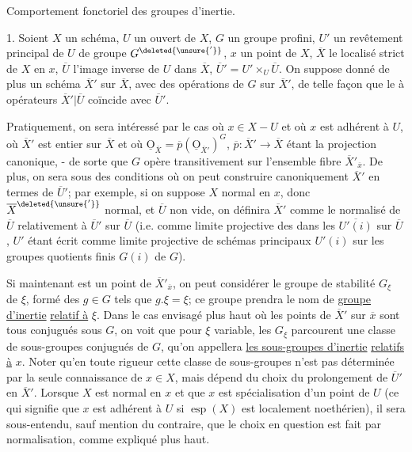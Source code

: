 Comportement fonctoriel des groupes d'inertie.

1. Soient $X$ un schéma, $U$ un ouvert de $X$, $G$ un groupe profini, $U'$ un revêtement principal de $U$ de groupe $G^{\deleted{\unsure{'}}}$, $x$ un point  de $X$, $\overline X$ le localisé strict de $X$ en $x$, $\overline U$ l'image inverse de $U$ dans $\overline X$, $\overline U'=U'\times_U\overline U$. On suppose donné de plus un schéma $\overline X'$ sur $\overline X$, avec des opérations de $G$ sur $\overline X'$, de telle façon que le   à opérateurs $\overline X'|\overline U$ coïncide avec $\overline U'$.

Pratiquement, on sera intéressé par le cas où $x\in X-U$ et où $x$ est adhérent à $U$, où $\overline X'$ est entier sur $\overline X$ et où $\underline{\mathrm O}_{\overline X}=\overline p(\underline{\mathrm O}_{\overline X'})^G$, $\overline p:\overline X'\to\overline X$ étant la projection canonique, - de sorte que $G$ opère transitivement sur l'ensemble fibre $\overline X'_{\overline x}$. De plus, on  sera  sous des conditions où on peut construire canoniquement $\overline X'$ en termes de $\overline U'$; par exemple, si on suppose $X$ normal en $x$, donc $\overline X^{\deleted{\unsure{'}}}$ normal, et $\overline U$ non vide, on définira $\overline X'$ comme le normalisé de $\overline U$ relativement à $\overline U'$ sur $\overline U$ (i.e. comme limite projective des  dans les $\overline{U'(i)}$ sur $\overline U$, $U'$ étant écrit comme limite projective de schémas principaux $U'(i)$ sur les groupes quotients finis $G(i)$ de $G$).

Si maintenant  \inserted{$\xi$} est un point de $\overline X'_{\overline x}$, on peut considérer le groupe de stabilité $G_\xi$ de $\xi$, formé des $g\in G$ tels que $g.\xi=\xi$; ce groupe prendra le nom de \uline{groupe d'inertie} \uline{relatif à} $\xi$. Dans le cas envisagé plus haut où les points de $\overline X'$ sur $\overline x$ sont tous conjugués sous $G$, on voit que pour $\xi$ variable, les $G_\xi$ parcourent une classe de sous-groupes conjugués de $G$, qu'on appellera  \uline{les sous-groupes d'inertie}  \uline{relatifs à} $x$. Noter qu'en toute rigueur cette classe de sous-groupes  n'est pas déterminée par la seule connaissance de $x\in X$, mais dépend du choix du prolongement de $\overline U'$ en $\overline X'$. Lorsque $X$ est normal en $x$ et que $x$ est spécialisation d'un point de $U$ (ce qui signifie que $x$ est adhérent à $U$ si $\operatorname{esp}(X)$ est localement noethérien), il sera sous-entendu, sauf mention du contraire, que le choix en question est fait par normalisation, comme expliqué plus haut.
